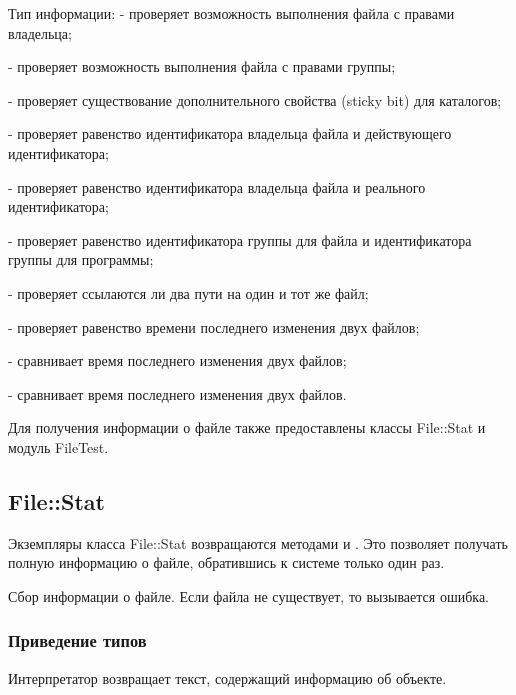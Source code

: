 \begin{methodlist}
\begin{keylist}{Тип информации:}
     - проверяет возможность выполнения файла с правами владельца; 
    
     - проверяет возможность выполнения файла с правами группы; 
    
     - проверяет существование дополнительного свойства (sticky bit) для каталогов; 
    
     - проверяет равенство идентификатора владельца файла и действующего идентификатора; 
    
     - проверяет равенство идентификатора владельца файла и реального идентификатора; 
    
     - проверяет равенство идентификатора группы для файла и идентификатора группы для программы; 
    
     - проверяет ссылаются ли два пути на один и тот же файл;
    
     - проверяет равенство времени последнего изменения двух файлов;
    
     - сравнивает время последнего изменения двух файлов;
    
     - сравнивает время последнего изменения двух файлов.
  \end{keylist}
\end{methodlist}  

Для получения информации о файле также предоставлены классы File::Stat и модуль FileTest. 

\subsection{File::Stat}

Экземпляры класса File::Stat возвращаются методами  и . Это позволяет получать полную информацию о файле, обратившись к системе только один раз.

\begin{methodlist}
  Сбор информации о файле. Если файла не существует, то вызывается ошибка.
\end{methodlist}

\subsubsection*{Приведение типов}

\begin{methodlist}
  Интерпретатор возвращает текст, содержащий информацию об объекте.
\end{methodlist}

